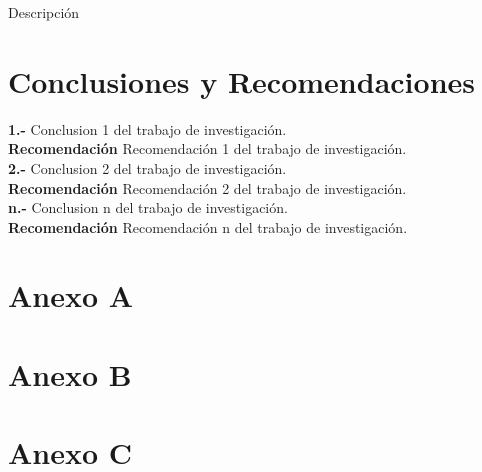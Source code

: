 \documentclass[oneside,11pt]{Latex/Classes/PhDthesisPSnPDF}
\begin{document}
Descripción\\

\chapter{Conclusiones y Recomendaciones}

\textbf{1.-} Conclusion 1 del trabajo de investigación.\\

\textbf{Recomendación} Recomendación 1 del trabajo de investigación.\\

\textbf{2.-} Conclusion 2 del trabajo de investigación.\\

\textbf{Recomendación} Recomendación 2 del trabajo de investigación.\\

\textbf{n.-} Conclusion n del trabajo de investigación.\\

\textbf{Recomendación} Recomendación n del trabajo de investigación.\\

\appendix
\renewcommand{\thechapter}{\Alph{chapter}}

\chapter{Anexo A}

\chapter{Anexo B}

\chapter{Anexo C}

\renewcommand{\bibname}{Lista de Referencias}
 
 

\end{document}
